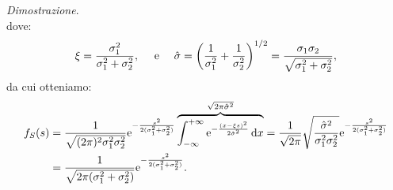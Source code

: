 \documentclass[11pt]{book}
\makeatletter
\theoremstyle{Definizione}
\theoremstyle{TeoremaProposizioneLemmaCorollario}
\theoremstyle{OsservazioneNota}
\renewenvironment{proof}[1][\proofname]{\par
  \normalfont \topsep6\p@\@plus6\p@\relax
  \trivlist
  \item[\hskip\labelsep
        \itshape
    #1\@addpunct{.}]\ignorespaces
}{%
  \endtrivlist\@endpefalse
}
\renewcommand{\d}{\mathrm{d}}
\newcommand{\dx}{\,\d x}
\newcommand{\e}{\textup{e}}
\renewenvironment{proof}{\textsl{Dimostrazione}.}{}
\makeatother
\begin{document}
\begin{boxpro}
\begin{proof}
$$$$
dove:
$$
\xi = \frac{\sigma_1^2}{\sigma_1^2+\sigma_2^2},\quad \textup{ e }\quad \hat{\sigma} = \left(\frac{1}{\sigma_1^2}+\frac{1}{\sigma_2^2}\right)^{1/2} = \frac{\sigma_1\sigma_2}{\sqrt{\sigma_1^2+\sigma_2^2}},
$$
da cui otteniamo:
\begin{align*}
f_S(s) &= \frac{1}{\sqrt{(2\pi)^2\sigma_1^2\sigma_2^2}}\e^{-\frac{s^2}{2(\sigma_1^2+\sigma_2^2)}}\overbrace{\int_{-\infty}^{+\infty} \e^{-\frac{(x-\xi s)^2}{2\hat{\sigma}^2}}\dx}^{\sqrt{2\pi\hat{\sigma}^2}} = \frac{1}{\sqrt{2\pi}}\sqrt{\frac{\hat{\sigma}^2}{\sigma_1^2\sigma_2^2}}\e^{-\frac{s^2}{2(\sigma_1^2+\sigma_2^2)}}\\
&= \frac{1}{\sqrt{2\pi(\sigma_1^2+\sigma_2^2)}}\e^{-\frac{s^2}{2(\sigma_1^2+\sigma_2^2)}}.
\end{align*}
\end{proof}
\end{boxpro}
\vfill 


\end{document}
